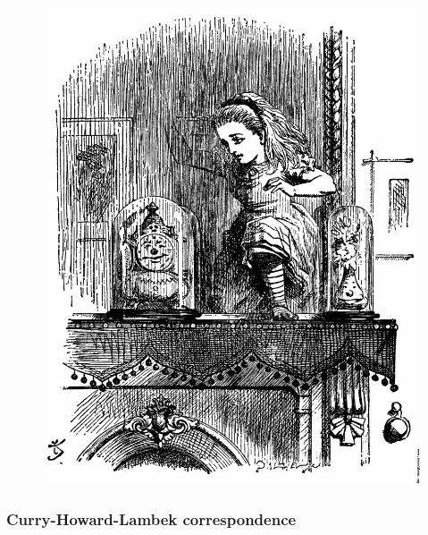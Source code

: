 \documentclass[
xcolor={usenames,dvipsnames,svgnames},
]{beamer}
\begin{document}
\begin{frame}
\begin{figure}
\begin{minipage}{.5\textwidth}
        \includegraphics[width=\textwidth]{graphics/013-Alice-emerging-from-the-looking-glass-q42-1725x2168.jpg}
      \end{minipage}

    \end{figure}
  \end{frame}

  \begin{frame}
    \frametitle{Curry-Howard-Lambek correspondence}
    \begin{center}
    \end{center}
  \end{frame}
\end{document}
